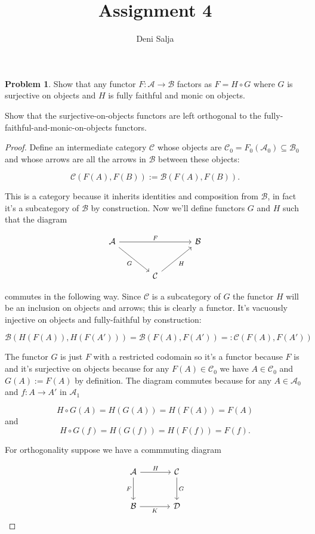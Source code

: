 \documentclass[11pt]{amsart}
\title{Assignment 4}
\author{Deni Salja}
\theoremstyle{plain}
\theoremstyle{definition}
\newtheorem{prob}{Problem}
\newcommand{\cA}{{\mathcal A}}
\newcommand{\cB}{{\mathcal B}}
\newcommand{\cC}{{\mathcal C}}
\newcommand{\cD}{{\mathcal D}}
\newcommand{\noi}{{\noindent}}
\begin{document}
\maketitle

\begin{prob}
Show that any functor $F : \cA \to \cB$ factors as $F = H \circ G$ where $G$ is surjective on objects and $H$ is fully faithful and monic on objects. \medskip 

\noi Show that the surjective-on-objects functors are left orthogonal to the fully-faithful-and-monic-on-objects functors. 
\end{prob}
\begin{proof}
Define an intermediate category $\cC$ whose objects are $\cC_0 = F_0(\cA_0) \subseteq \cB_0$  and whose arrows are all the arrows in $\cB$ between these objects:

\[ \cC(F(A), F(B)) := \cB(F(A),F(B)).\]

\noi This is a category because it inherits identities and composition from $\cB$, in fact it's a subcategory of $\cB$ by construction. Now we'll define functors $G$ and $H$ such that the diagram 

\[\begin{tikzcd}[column sep = large, row sep = large]
\cA \rar[rr, "F"] \ar[dr, "G"'] && \cB \\
& \cC \ar[ur,"H"'] & 
\end{tikzcd}\]

\noi commutes in the following way. Since $\cC$ is a subcategory of $G$ the functor $H$ will be an inclusion on objects and arrows; this is clearly a functor. It's vacuously injective on objects and fully-faithful by construction:

\[ \cB(H(F(A)), H(F(A'))) = \cB(F(A), F(A')) =: \cC(F(A), F(A')) \] 

\noi The functor $G$ is just $F$ with a restricted codomain so it's a functor because $F$ is and it's surjective on objects because for any $F(A) \in \cC_0$ we have $A \in \cC_0$ and $G(A) := F(A)$ by definition. The diagram commutes because for any $A \in \cA_0$ and $f : A \to A'$ in $\cA_1$ 

\[ H \circ G ( A) = H(G(A)) = H(F(A)) = F(A)\]
\noi and 
\[ H \circ G(f) = H(G(f)) = H(F(f)) = F(f).\]\bigskip 

For orthogonality suppose we have a commmuting diagram 

\[ \begin{tikzcd}[column sep = large, row sep = large]
    \cA \rar["H"] \dar["F"'] &\cC \dar["G"] \\
    \cB \rar["K"'] & \cD 
\end{tikzcd}\]


\end{proof}
\end{document}
